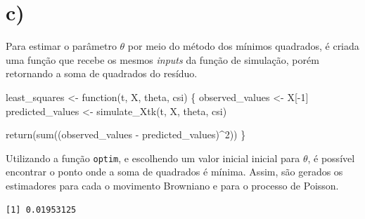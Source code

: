 \documentclass[
  letterpaper,
  DIV=11,
  numbers=noendperiod]{scrreprt}
\newenvironment{Shaded}{\begin{snugshade}}{\end{snugshade}}
\newcommand{\AttributeTok}[1]{\textcolor[rgb]{0.40,0.45,0.13}{#1}}
\newcommand{\ControlFlowTok}[1]{\textcolor[rgb]{0.00,0.23,0.31}{#1}}
\newcommand{\DecValTok}[1]{\textcolor[rgb]{0.68,0.00,0.00}{#1}}
\newcommand{\DocumentationTok}[1]{\textcolor[rgb]{0.37,0.37,0.37}{\textit{#1}}}
\newcommand{\FunctionTok}[1]{\textcolor[rgb]{0.28,0.35,0.67}{#1}}
\newcommand{\NormalTok}[1]{\textcolor[rgb]{0.00,0.23,0.31}{#1}}
\newcommand{\OtherTok}[1]{\textcolor[rgb]{0.00,0.23,0.31}{#1}}
\newcommand{\SpecialCharTok}[1]{\textcolor[rgb]{0.37,0.37,0.37}{#1}}
\begin{document}
\hypertarget{c-1}{%
\section*{c)}\label{c-1}}


Para estimar o parâmetro \(\theta\) por meio do método dos mínimos
quadrados, é criada uma função que recebe os mesmos \emph{inputs} da
função de simulação, porém retornando a soma de quadrados do resíduo.

\begin{Shaded}
\begin{Highlighting}[]
\NormalTok{least\_squares }\OtherTok{\textless{}{-}} \ControlFlowTok{function}\NormalTok{(t, X, theta, csi) \{}
\NormalTok{    observed\_values }\OtherTok{\textless{}{-}}\NormalTok{ X[}\SpecialCharTok{{-}}\DecValTok{1}\NormalTok{]}
\NormalTok{    predicted\_values }\OtherTok{\textless{}{-}} \FunctionTok{simulate\_Xtk}\NormalTok{(t, X, theta, csi)}

    \FunctionTok{return}\NormalTok{(}\FunctionTok{sum}\NormalTok{((observed\_values }\SpecialCharTok{{-}}\NormalTok{ predicted\_values)}\SpecialCharTok{\^{}}\DecValTok{2}\NormalTok{))}
\NormalTok{\}}
\end{Highlighting}
\end{Shaded}

Utilizando a função \texttt{optim}, e escolhendo um valor inicial
inicial para \(\theta\), é possível encontrar o ponto onde a soma de
quadrados é mínima. Assim, são gerados os estimadores para cada o
movimento Browniano e para o processo de Poisson.

\begin{Shaded}
\end{Shaded}

\begin{verbatim}
[1] 0.01953125
\end{verbatim}
\end{document}
